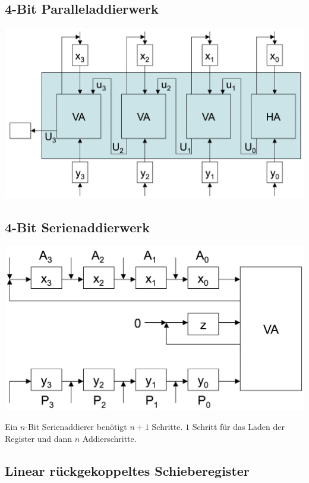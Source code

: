 \documentclass[a4paper,6pt]{article}
\begin{document}
\begin{multicols*}{3}
\subsection*{4-Bit Paralleladdierwerk}

\begin{center}
    \includegraphics[width=1\linewidth]{resources/4Bit-Paralleladdierwerk.png}
\end{center}

\subsection*{4-Bit Serienaddierwerk}

\begin{center}
    \includegraphics[width=1\linewidth]{resources/4Bit-Serienaddierwerk.png}
\end{center}

Ein $n$-Bit Serienaddierer benötigt $n + 1$ Schritte. $1$ Schritt für das Laden der Register und dann $n$ Addierschritte.

\subsection*{Linear rückgekoppeltes Schieberegister}


\end{multicols*}
\end{document}

